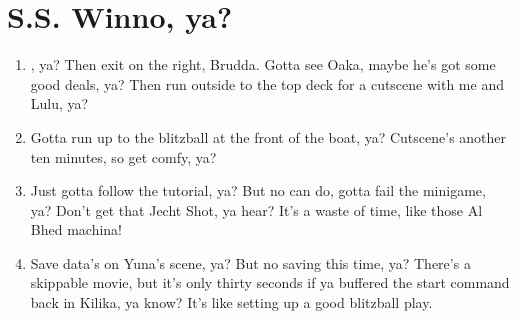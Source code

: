 \chapter{S.S. Winno, ya?}
\begin{enumerate}
    \item \cs[1:10], ya? Then exit on the right, Brudda. Gotta see Oaka, maybe he's got some good deals, ya? Then run outside to the top deck for a cutscene with me and Lulu, ya?
    \item Gotta run up to the blitzball at the front of the boat, ya? Cutscene's another ten minutes, so get comfy, ya?
    \item Just gotta follow the tutorial, ya? But no can do, gotta fail the minigame, ya? Don't get that Jecht Shot, ya hear? It's a waste of time, like those Al Bhed machina!
    \item Save data's on Yuna's scene, ya? But no saving this time, ya? There's a skippable movie, but it's only thirty seconds if ya buffered the start command back in Kilika, ya know? It's like setting up a good blitzball play.
\end{enumerate}